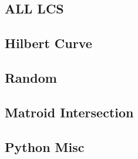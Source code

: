 \subsection{ALL LCS}

\subsection{Hilbert Curve}

\subsection{Random}

% 
\subsection{Matroid Intersection}

\subsection{Python Misc}
